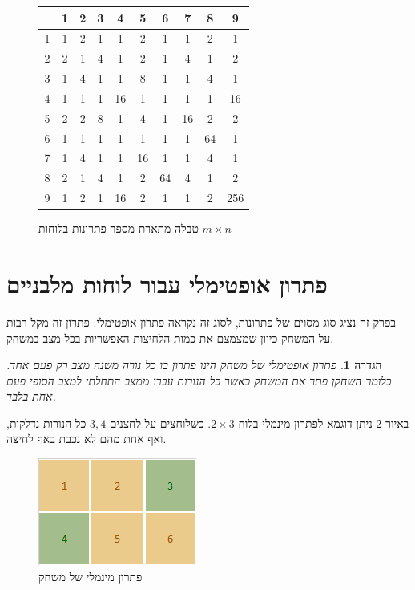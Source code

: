 \documentclass[12pt,leqno]{article}
\theoremstyle{theoremdd}
\newtheorem{definition}{הגדרה}[section]
\begin{document}
\begin{figure}
    \caption{טבלה מתארת מספר פתרונות בלוחות 
    $m \times n$
    }
    \centering
    \label{fig:num-sol-in-table}
    \begin{english}
        \begin{tabular}{ |c||c|c|c|c|c|c|c|c|c| }
            \hline
            \ & 1 & 2 & 3 & 4 & 5 & 6 & 7 & 8 & 9 \\
            \hline
            \hline
            1 & 1 & 2 & 1 & 1 & 2 & 1 & 1 & 2 & 1 \\
            \hline
            2 & 2 & 1 & 4 & 1 & 2 & 1 & 4 & 1 & 2 \\
            \hline
            3 & 1 & 4 & 1 & 1 & 8 & 1 & 1 & 4 & 1 \\
            \hline
            4 & 1 & 1 & 1 & 16 & 1 & 1 & 1 & 1 & 16 \\
            \hline
            5 & 2 & 2 & 8 & 1 & 4 & 1 & 16 & 2 & 2 \\
            \hline
            6 & 1 & 1 & 1 & 1 & 1 & 1 & 1 & 64 & 1 \\
            \hline
            7 & 1 & 4 & 1 & 1 & 16 & 1 & 1 & 4 & 1 \\
            \hline
            8 & 2 & 1 & 4 & 1 & 2 & 64 & 4 & 1 & 2 \\
            \hline
            9 & 1 & 2 & 1 & 16 & 2 & 1 & 1 & 2 & 256 \\
            \hline
        \end{tabular}
    \end{english}
\end{figure}

\section{פתרון אופטימלי עבור לוחות מלבניים}
בפרק זה נציג סוג מסוים של פתרונות,
לסוג זה נקראה פתרון אופטימלי.
פתרון זה מקל רבות על המשחק 
כיוון שמצמצם את כמות הלחיצות האפשריות בכל מצב במשחק.
\begin{definition}
    \label{def: opt-sol}
    פתרון אופטימלי של משחק הינו פתרון 
    בו כל נורה משנה מצב רק פעם אחד.
    כלומר 
    השחקן פתר את המשחק כאשר 
    כל הנורות עברו ממצב התחלתי למצב הסופי פעם אחת בלבד.
\end{definition}
באיור 
\ref{fig: min sol 2x3}
ניתן דוגמא לפתרון מינמלי 
בלוח 
$2 \times 3$.
כשלוחצים על לחצנים 
$3, 4$
כל הנורות נדלקות, ואף 
אחת מהם לא נכבת באף לחיצה.

\begin{figure}[ht]
    \caption{פתרון מינמלי של משחק}
    \label{fig: min sol 2x3}
    \centering
    \includegraphics[width=.3\textwidth,keepaspectratio]{images/min_sol_2x3.PNG}
\end{figure}
\end{document}
